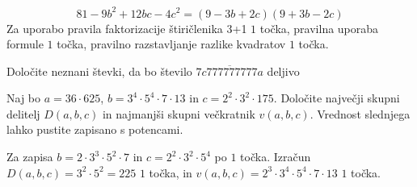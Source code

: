 \documentclass[addpoints]{exam}
\begin{document}
\begin{questions}
\begin{parts}
        \begin{solution}[3cm]
            $$81-9b^2+12bc-4c^2=(9-3b+2c)(9+3b-2c)$$
            Za uporabo pravila faktorizacije štiričlenika 3+1 $1$ točka, pravilna uporaba formule $1$ točka, pravilno razstavljanje razlike kvadratov $1$ točka.
        \end{solution}


    \end{parts}



    \question
    Določite neznani števki, da bo število $\overline{7c777777777a}$ deljivo




    \question[4]
    Naj bo $a=36\cdot 625$, $b=3^4\cdot 5^4\cdot 7\cdot 13$ in $c=2^2\cdot 3^2\cdot 175$. 
    Določite največji skupni delitelj $D(a,b,c)$ in najmanjši skupni večkratnik $v(a,b,c)$. Vrednost slednjega lahko pustite zapisano s potencami.

    \begin{solution}[7cm]
        Za zapisa $b=2\cdot 3^3\cdot 5^2\cdot 7$ in $c=2^2\cdot 3^2\cdot 5^4$ po $1$ točka. 
        Izračun $D(a,b,c)=3^2\cdot 5^2=225$ $1$ točka, in $v(a,b,c)=2^3\cdot 3^4\cdot 5^4\cdot 7\cdot 13$ $1$ točka.
    \end{solution}
    

\end{questions}
\end{document}
